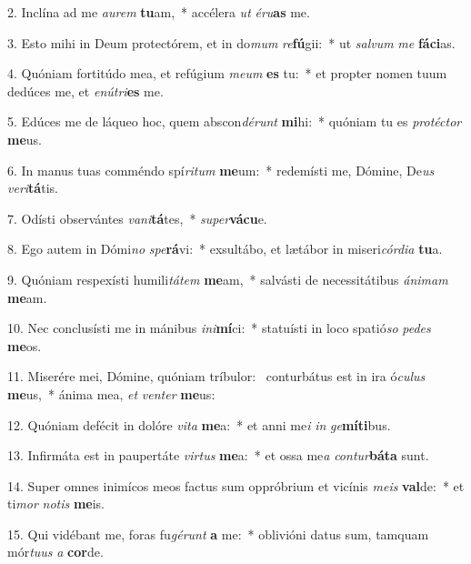 2. Inclína ad me \textit{au}\textit{rem} \textbf{tu}am,~*  accélera \textit{ut} \textit{é}\textit{ru}\textbf{as} me.\

3. Esto mihi in Deum protectórem, et in do\textit{mum} \textit{re}\textbf{fú}gii:~*  ut \textit{sal}\textit{vum} \textit{me} \textbf{fá}\textbf{ci}as.\

4. Quóniam fortitúdo mea, et refúgium \textit{me}\textit{um} \textbf{es} tu:~*  et propter nomen tuum dedúces me, et \textit{e}\textit{nú}\textit{tri}\textbf{es} me.\

5. Edúces me de láqueo hoc, quem abscon\textit{dé}\textit{runt} \textbf{mi}hi:~*  quóniam tu es \textit{pro}\textit{téc}\textit{tor} \textbf{me}us.\

6. In manus tuas comméndo spí\textit{ri}\textit{tum} \textbf{me}um:~*  redemísti me, Dómine, De\textit{us} \textit{ve}\textit{ri}\textbf{tá}tis.\

7. Odísti observántes \textit{va}\textit{ni}\textbf{tá}tes,~*  \textit{su}\textit{per}\textbf{vá}\textbf{cu}e.\

8. Ego autem in Dómi\textit{no} \textit{spe}\textbf{rá}vi:~*  exsultábo, et lætábor in miseri\textit{cór}\textit{di}\textit{a} \textbf{tu}a.\

9. Quóniam respexísti humili\textit{tá}\textit{tem} \textbf{me}am,~*  salvásti de necessitátibus \textit{á}\textit{ni}\textit{mam} \textbf{me}am.\

10. Nec conclusísti me in mánibus \textit{in}\textit{i}\textbf{mí}ci:~*  statuísti in loco spatió\textit{so} \textit{pe}\textit{des} \textbf{me}os.\

11. Miserére mei, Dómine, quóniam tríbulor: \dag\  conturbátus est in ira ó\textit{cu}\textit{lus} \textbf{me}us,~*  ánima mea, \textit{et} \textit{ven}\textit{ter} \textbf{me}us:\

12. Quóniam defécit in dolóre \textit{vi}\textit{ta} \textbf{me}a:~*  et anni me\textit{i} \textit{in} \textit{ge}\textbf{mí}\textbf{ti}bus.\

13. Infirmáta est in paupertáte \textit{vir}\textit{tus} \textbf{me}a:~*  et ossa me\textit{a} \textit{con}\textit{tur}\textbf{bá}\textbf{ta} sunt.\

14. Super omnes inimícos meos factus sum oppróbrium et vicínis \textit{me}\textit{is} \textbf{val}de:~*  et ti\textit{mor} \textit{no}\textit{tis} \textbf{me}is.\

15. Qui vidébant me, foras fu\textit{gé}\textit{runt} \textbf{a} me:~*  oblivióni datus sum, tamquam mór\textit{tu}\textit{us} \textit{a} \textbf{cor}de.\

